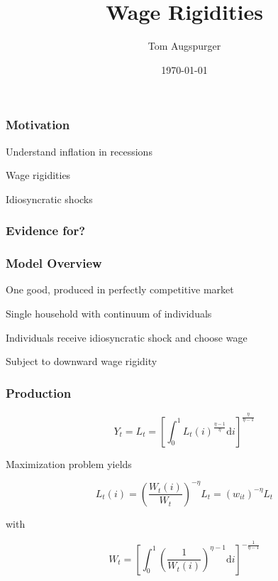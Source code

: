 \documentclass{beamer}
\title{Wage Rigidities}
\author{Tom Augspurger}
\date{\today}
\begin{document}
\frame{\titlepage}


\begin{frame}[t]\frametitle{Motivation}

    Understand inflation in recessions

    Wage rigidities

    Idiosyncratic shocks

\end{frame}

\begin{frame}[t]\frametitle{Evidence for?}



\end{frame}

\begin{frame}[t]\frametitle{Model Overview}

One good, produced in perfectly competitive market

Single household with continuum of individuals

Individuals receive idiosyncratic shock and choose wage

Subject to downward wage rigidity

\end{frame}

\begin{frame}[t]\frametitle{Production}

\begin{equation*} \label{eq:agg_labor}
    Y_t = L_t = \left[ \int_0^1 L_t(i)^{\frac{\eta - 1}{\eta}} \mathup{d}i \right]^{\frac{\eta}{\eta - 1}}
\end{equation*}

Maximization problem yields

\begin{equation*}
    \label{eq:labor_demand}
    L_t(i) = \left( \frac{W_t(i)}{W_t} \right)^{-\eta}L_t = (w_{it})^{-\eta}L_t
\end{equation*}

with

\begin{equation*} \label{eq:wage_index}
    W_t = \left[\int_{0}^{1}\left(\frac{1}{W_t(i)}\right)^{\eta - 1} \mathup{d}i \right]^{-\frac{1}{\eta - 1}}
\end{equation*}



\end{frame}
\end{document}
